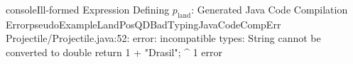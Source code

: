 \begin{pseudocode}{console}{Ill-formed Expression Defining \(p_\text{land}\): Generated Java Code Compilation Error}{pseudoExampleLandPosQDBadTypingJavaCodeCompErr}
Projectile/Projectile.java:52: error: incompatible types: String cannot be converted to double
        return 1 + "Drasil";
                 ^
1 error
\end{pseudocode}
